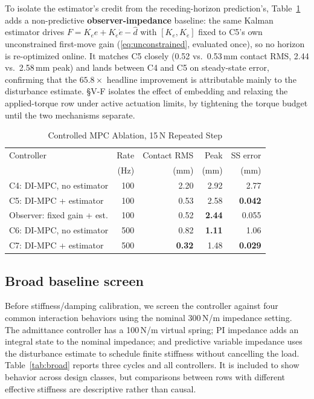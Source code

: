 \documentclass[conference]{IEEEtran}
\newcommand{\dhat}{\hat d}
\begin{document}
To isolate the estimator's credit from the receding-horizon prediction's,
Table~\ref{tab:ablation} adds a non-predictive \textbf{observer-impedance}
baseline: the same Kalman estimator drives $F=K_ee+K_{\dot e}\dot e-\dhat$
with $[K_e,K_{\dot e}]$ fixed to C5's own unconstrained first-move gain
(\eqref{eq:unconstrained}, evaluated once), so no horizon is re-optimized
online. It matches C5 closely (0.52 vs.\ 0.53\,mm contact RMS, 2.44 vs.\
2.58\,mm peak) and lands between C4 and C5 on steady-state error,
confirming that the $65.8\times$ headline improvement is attributable
mainly to the disturbance estimate. \S V-F isolates the effect of
embedding and relaxing the applied-torque row under active actuation
limits, by tightening the torque budget until the two mechanisms
separate.

\begin{table}[t]
\caption{Controlled MPC Ablation, 15\,N Repeated Step}
\label{tab:ablation}
\centering
\footnotesize
\setlength{\tabcolsep}{3.2pt}
\begin{tabular}{@{}lrrrr@{}}
\toprule
Controller & Rate & Contact RMS & Peak & SS error\\
 & (Hz) & (mm) & (mm) & (mm)\\
\midrule
C4: DI-MPC, no estimator & 100 & 2.20 & 2.92 & 2.77\\
C5: DI-MPC + estimator & 100 & 0.53 & 2.58 & \textbf{0.042}\\
Observer: fixed gain + est. & 100 & 0.52 & \textbf{2.44} & 0.055\\
C6: DI-MPC, no estimator & 500 & 0.82 & \textbf{1.11} & 1.06\\
C7: DI-MPC + estimator & 500 & \textbf{0.32} & 1.48 & \textbf{0.029}\\
\bottomrule
\end{tabular}
\end{table}

\subsection{Broad baseline screen}

Before stiffness/damping calibration, we screen the controller against four common
interaction behaviors using the nominal 300\,N/m impedance setting. The
admittance controller has a 100\,N/m virtual spring; PI impedance adds an
integral state to the nominal impedance; and predictive variable impedance
uses the disturbance estimate to schedule finite stiffness without cancelling
the load. Table~\ref{tab:broad} reports three cycles and all controllers. It is
included to show behavior across design classes, but comparisons between rows
with different effective stiffness are descriptive rather than causal.
\end{document}
